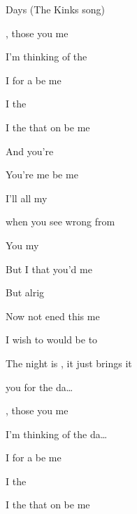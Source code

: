 \begin{SBSong}{Days (The Kinks song)}
\begin{SBVerse}
        , 
        those   you  me 

      I'm thinking of the  

      I  for  a   be me  

      I  the 

      I  the  that  on  be me   

      And  you're 

      You're  me    be me  
    \end{SBVerse}
    \CBPageBrk
    \begin{SBVerse}
 	 I'll  all my 

       when you  see wrong from 

	  You  my 

	  But  I  that   you'd  me 

	  But  alrig

      Now  not ened	 this   me 
    \end{SBVerse}
    \begin{SBVerse}
      I wish to would be to
    
      The night is , it just brings   it  
    \end{SBVerse}
    \begin{SBVerse}
	   you for the da\ldots{}

	    , 
	    those   you  me 

	  I'm thinking of the da\ldots{}
	
	  I  for  a   be me  

	  I  the 

	  I  the  that  on  be me   


\end{SBVerse}
\end{SBSong}
